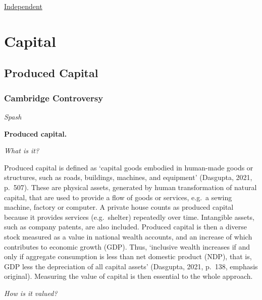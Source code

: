 \documentclass[
]{book}
\begin{document}
\href{https://www.independent.co.uk/climate-change/news/energy-transport-cost-fossil-fuels-b1805808.html}{Independent}

\hypertarget{capital}{%
\chapter{Capital}\label{capital}}

\hypertarget{produced-capital}{%
\section{Produced Capital}\label{produced-capital}}

\hypertarget{cambridge-controversy}{%
\subsection{Cambridge Controversy}\label{cambridge-controversy}}

\emph{Spash}

\textbf{Produced capital.}

\emph{What is it?}

Produced capital is defined as `capital goods embodied in human-made goods or structures, such as
roads, buildings, machines, and equipment' (Dasgupta, 2021, p.~507). These are physical assets,
generated by human transformation of natural capital, that are used to provide a flow of goods
or services, e.g.~a sewing machine, factory or computer. A private house counts as produced capital
because it provides services (e.g.~shelter) repeatedly over time. Intangible assets, such as company
patents, are also included. Produced capital is then a diverse stock measured as a value in national
wealth accounts, and an increase of which contributes to economic growth (GDP). Thus, `inclusive
wealth increases if and only if aggregate consumption is less than net domestic product (NDP), that
is, GDP less the depreciation of all capital assets' (Dasgupta, 2021, p.~138, emphasis original).
Measuring the value of capital is then essential to the whole approach.

\emph{How is it valued?}
\end{document}
